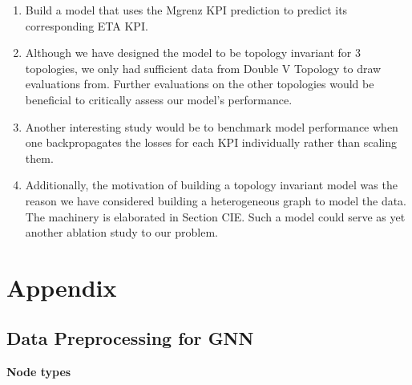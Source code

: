 \documentclass{report} %
\begin{document}
\begin{enumerate}
    \item Build a model that uses the Mgrenz \ac{KPI} prediction to predict its corresponding ETA \ac{KPI}. 
    \item Although we have designed the model to be topology invariant for 3 topologies, we only had sufficient data from Double V Topology to draw evaluations from.
    Further evaluations on the other topologies would be beneficial to critically assess our model's performance.
    \item Another interesting study would be to benchmark model performance when one backpropagates the losses for each \ac{KPI} individually rather than scaling them.
    \item Additionally, the motivation of building a topology invariant model was the reason we have considered building a heterogeneous graph to model the data. The machinery is elaborated in Section CIE.
    Such a model could serve as yet another ablation study to our problem.
\end{enumerate}

\newpage 

\newpage 

\chapter*{Appendix}

\section{Data Preprocessing for \ac{GNN}}\label{sec:Data Preprocessing for GNN}


\textbf{Node types}
\end{document}
